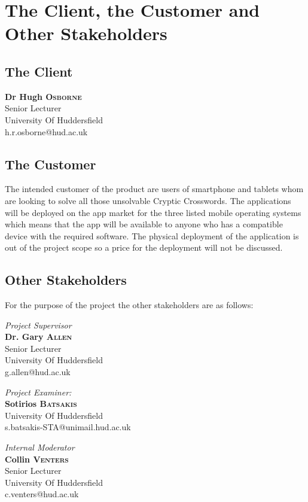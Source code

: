 \section{The Client, the Customer and Other Stakeholders}

\subsection{The Client}

	\textbf{Dr Hugh \textsc{Osborne}}\\
	Senior Lecturer\\
	University Of Huddersfield\\
	h.r.osborne@hud.ac.uk

\subsection{The Customer}

The intended customer of the product are users of smartphone and tablets whom are looking to solve all those unsolvable Cryptic Crosswords. The applications will be deployed on the app market for the three listed mobile operating systems which means that the app will be available to anyone who has a compatible device with the required software. The physical deployment of the application is out of the project scope so a price for the deployment will not be discussed.

\subsection{Other Stakeholders}

For the purpose of the project the other stakeholders are as follows:

      \emph{Project Supervisor}\\
      \textbf{Dr. Gary \textsc{Allen}} \\
      Senior Lecturer \\
      University Of Huddersfield \\
      g.allen@hud.ac.uk 

      \emph{Project Examiner:} \\ 
      \textbf{Sotirios \textsc{Batsakis}}\\
      University Of Huddersfield\\
      s.batsakis-STA@unimail.hud.ac.uk

      \emph{Internal Moderator}\\
      \textbf{Collin \textsc{Venters}} \\
      Senior Lecturer \\
      University Of Huddersfield \\
      c.venters@hud.ac.uk

